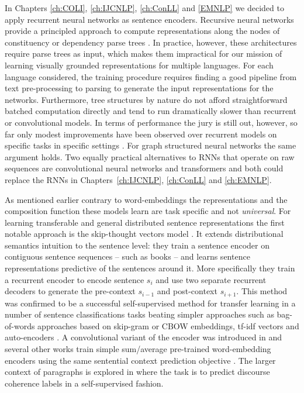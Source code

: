 In Chapters \ref{ch:COLI}, \ref{ch:IJCNLP}, \ref{ch:ConLL} and \ref{EMNLP} we decided to apply
recurrent neural networks as sentence encoders.
Recursive neural networks provide a principled approach to
compute representations along the nodes of constituency
or dependency parse trees \citep{socher2013recursive,socher2014grounded,le2015compositional,tai2015improved}.
In practice, however, these architectures require parse trees as input,
which makes them impractical for our mission of learning visually grounded
representations for multiple languages.
For each language considered, the training procedure requires finding a good
pipeline from text pre-processing to parsing to generate the input representations
for the networks. Furthermore, tree structures by nature do not
afford straightforward batched computation directly and tend to run dramatically
slower than recurrent or convolutional models. In terms of performance the jury
is still out, however, so far only modest improvements have been observed
over recurrent models on specific tasks in specific settings
\citep{li2015tree,tai2015improved}. For graph structured neural networks the
same argument holds. Two equally practical alternatives to RNNs
that operate on raw sequences are convolutional neural networks
\citep{bai2018empirical} and transformers \citep{vaswani2017attention} and both could
replace the RNNs in Chapters~\ref{ch:IJCNLP}, \ref{ch:ConLL} and \ref{ch:EMNLP}.



As mentioned earlier contrary to word-embeddings the representations
and the composition function these models learn are task specific and not \emph{universal}.
For learning transferable and general distributed sentence representations the
first notable approach is the
skip-thought vectors model \citep{kiros2015skip}.
It extends distributional semantics intuition to the sentence level:
they train a sentence encoder on contiguous sentence sequences
-- such as books -- and learns sentence representations predictive of the sentences around it.
More specifically
they train a recurrent encoder to encode sentence $s_i$ and use two separate recurrent decoders to
generate the pre-context $s_{i-1}$ and post-context $s_{i+1}$.
This method was confirmed to be a successful self-supervised method for transfer
learning in a number of sentence
classifications tasks beating simpler approaches such as bag-of-words approaches based on skip-gram
or CBOW embeddings, tf-idf vectors and auto-encoders \citep{hill2016learning}. A convolutional
variant of the encoder was introduced in \cite{gan2016unsupervised} and several other works
train simple sum/average pre-trained word-embedding encoders using the same sentential
context prediction objective \citep{kenter2016siamese,hill2016learning}. The larger context of paragraphs is
explored in \cite{jernite2017discourse} where the task is to predict discourse coherence
labels in a self-supervised fashion.

